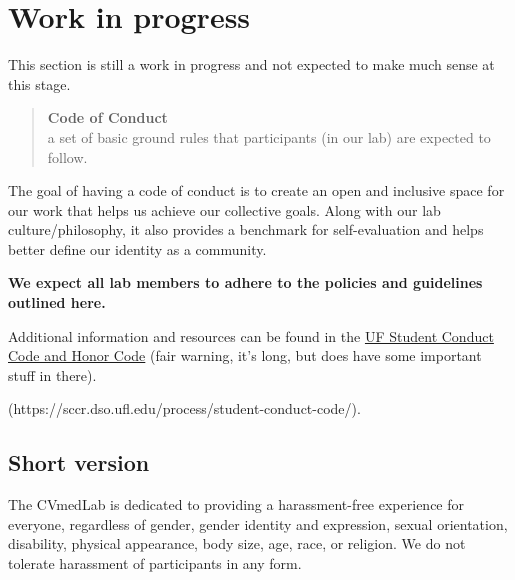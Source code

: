 \documentclass[
  letterpaper,
  DIV=11,
  numbers=noendperiod]{scrreprt}
\begin{document}
\begin{tcolorbox}[enhanced jigsaw, colframe=quarto-callout-caution-color-frame, opacityback=0, leftrule=.75mm, bottomrule=.15mm, rightrule=.15mm, left=2mm, toptitle=1mm, colback=white, bottomtitle=1mm, titlerule=0mm, title=\textcolor{quarto-callout-caution-color}{\faFire}\hspace{0.5em}{Danger}, arc=.35mm, toprule=.15mm, breakable, coltitle=black, colbacktitle=quarto-callout-caution-color!10!white, opacitybacktitle=0.6]


\hypertarget{work-in-progress-1}{%
\chapter{Work in progress}\label{work-in-progress-1}}

This section is still a work in progress and not expected to make much
sense at this stage.

\end{tcolorbox}

\begin{quote}
\textbf{Code of Conduct}\\
a set of basic ground rules that participants (in our lab) are expected
to follow.
\end{quote}

The goal of having a code of conduct is to create an open and inclusive
space for our work that helps us achieve our collective goals. Along
with our lab culture/philosophy, it also provides a benchmark for
self-evaluation and helps better define our identity as a community.

\textbf{We expect all lab members to adhere to the policies and
guidelines outlined here.}

Additional information and resources can be found in the
\href{https://regulations.ufl.edu/wp-content/uploads/2021/12/4-040_2021-12-06.pdf}{UF
Student Conduct Code and Honor Code} (fair warning, it's long, but does
have some important stuff in there).

(https://sccr.dso.ufl.edu/process/student-conduct-code/).

\hypertarget{short-version}{%
\section{Short version}\label{short-version}}

The CVmedLab is dedicated to providing a harassment-free experience for
everyone, regardless of gender, gender identity and expression, sexual
orientation, disability, physical appearance, body size, age, race, or
religion. We do not tolerate harassment of participants in any form.
\end{document}
